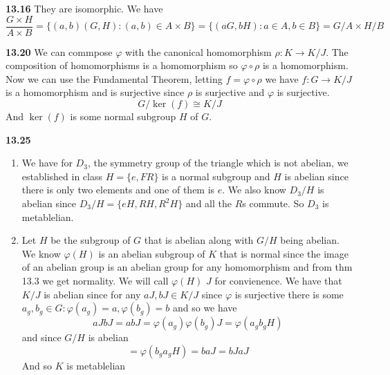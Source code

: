 \documentclass[12pt]{article}
\newenvironment{ques}{\vspace{2 ex}}{\vspace{2 ex}}
\theoremstyle{definition}
\begin{document}
\begin{ques}
	\textbf{13.16} 
		They are isomorphic. We have
		$$\frac{G \times H}{A \times B} = \{(a, b)(G, H): (a, b) \in A
		\times B\} = \{(aG, bH): a \in A, b \in B\} = G/A \times H/B$$
\end{ques}

\begin{ques} 
	\textbf{13.20} 
		We can commpose $\varphi$ with the canonical homomorphism $\rho
		: K \to K/J$. The composition of homomorphisms is a
		homomorphism so $\varphi \circ \rho$ is a homomorphism.
		Now we can use the Fundamental Theorem, letting $f = \varphi
		\circ \rho$ we have $f: G \to K/J$ is a homomorphism and is
		surjective since $\rho$ is surjective and $\varphi$ is
		surjective.
		$$G/\ker(f) \cong K/J$$
		And $\ker(f)$ is some normal subgroup $H$ of $G$.
\end{ques}

\begin{ques} 
	\textbf{13.25} 
		\begin{enumerate}
			\item
				We have for $D_3$, the symmetry group of the
				triangle which is not abelian, we established
				in class $H = \{e, FR\}$ is a normal subgroup
				and $H$ is abelian since there is only two
				elements and one of them is $e$.  We also know
				$D_3/H$ is abelian since $D_3/H = \{eH, RH,
				R^2H\}$ and all the $R$s commute. So $D_3$ is
				metablelian. 
			\item
				Let $H$ be the subgroup of $G$ that is
				abelian along with $G/H$ being abelian. We know
				$\varphi(H)$ is an abelian subgroup of $K$ that
				is normal since the image of an abelian group
				is an abelian group for any homomorphism and
				from thm 13.3 we get normality. We will call
				$\varphi(H)$ $J$ for convienence. We have
				that $K/J$ is abelian since for any
				$aJ, bJ \in K/J$ since $\varphi$ is
				surjective there is some $a_g, b_g \in G:
				\varphi(a_g) = a, \varphi(b_g) = b$ and so we
				have 
				$$aJbJ = abJ = \varphi(a_g)\varphi(b_g)J =
				\varphi(a_gb_gH)$$
				and since $G/H$ is abelian
				$$= \varphi(b_ga_gH) = baJ = bJaJ$$
				And so $K$ is metablelian

		\end{enumerate}
\end{ques}
\end{document}
